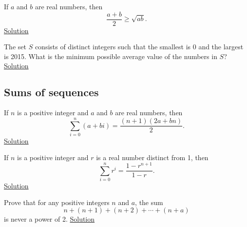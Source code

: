 \begin{result}[2-variable AM-GM]\label{r:b:a:ineq:1}
  If $a$ and $b$ are real numbers, then \[\frac{a+b}2\ge\sqrt{ab}.\]
  \hyperlink{sr:b:a:ineq:1}{Solution}
\end{result}

\begin{problem}\label{p:b:a:ineq:1}
  The set $S$ consists of distinct integers such that the smallest is 0 and the
  largest is 2015. What is the minimum possible average value of the numbers in
  $S$?
  \hyperlink{sp:b:a:ineq:1}{Solution}
\end{problem}
\subsection{Sums of sequences}
\begin{result}\label{r:b:a:sums:1}
  If $n$ is a positive integer and $a$ and $b$ are real numbers, then
  \[\sum_{i=0}^n(a+bi)=\frac{(n+1)(2a+bn)}2.\]
  \hyperlink{sr:b:a:sums:1}{Solution}
\end{result}
\begin{result}\label{r:b:a:sums:2}
  If $n$ is a positive integer and $r$ is a real number distinct from 1, then
  \[\sum_{i=0}^n r^i=\frac{1-r^{n+1}}{1-r}.\]
  \hyperlink{sr:b:a:sums:2}{Solution}
\end{result}
\begin{problem}\label{p:b:a:sums:1}
  Prove that for any positive integers $n$ and $a$, the sum
  \[n+(n+1)+(n+2)+\cdots+(n+a)\] is never a power of 2.
  \hyperlink{sp:b:a:sums:1}{Solution}
\end{problem}
